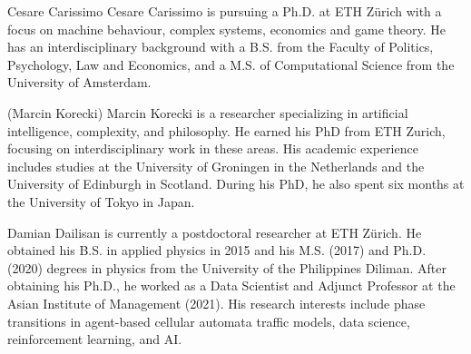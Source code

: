 {Cesare Carissimo}
Cesare Carissimo is pursuing a Ph.D. at ETH Zürich with a focus on machine behaviour, complex systems, economics and game theory. He has an interdisciplinary background with a B.S. from the Faculty of Politics, Psychology, Law and Economics, and a M.S. of Computational Science from the University of
Amsterdam.

(Marcin Korecki)
Marcin Korecki is a researcher specializing in artificial intelligence, complexity, and philosophy. He earned his PhD from ETH Zurich, focusing on interdisciplinary work in these areas. His academic experience includes studies at the University of Groningen in the Netherlands and the University of Edinburgh in Scotland. During his PhD, he also spent six months at the University of Tokyo in Japan.

{Damian Dailisan }
is currently a postdoctoral researcher at ETH Z\"urich. He obtained his B.S. in applied physics in 2015 and his M.S. (2017) and Ph.D. (2020) degrees in physics from the University of the Philippines Diliman. After obtaining his Ph.D., he worked as a Data Scientist and Adjunct Professor at the Asian Institute of Management (2021). His research interests include phase transitions in agent-based cellular automata traffic models, data science, reinforcement learning, and AI.